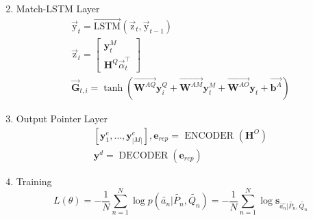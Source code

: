 \documentclass[a4paper,UTF8]{article}
\numberwithin{equation}{section}
\begin{document}
\begin{enumerate}
\begin{equation}
	\end{equation}
	\item Match-LSTM Layer
	\begin{equation}
	\begin{array}{c}{\overrightarrow{\mathrm{y}}_{t}=\overrightarrow{\mathrm{LSTM}}\left(\overrightarrow{\mathrm{z}}_{t}, \overrightarrow{\mathrm{y}}_{t-1}\right)} \\ {\overrightarrow{\mathrm{z}}_{t}=\left[\begin{array}{c}{\mathbf{y}_{t}^{M}} \\ {\mathbf{H}^{Q} \vec{\alpha}_{t}^{\top}}\end{array}\right]}\\\overrightarrow{\mathbf{G}}_{t, i}=\tanh \left(\overrightarrow{\mathbf{W}^{A Q}} \mathbf{y}_{i}^{Q}+\overrightarrow{\mathbf{W}^{A M}} \mathbf{y}_{t}^{M}+\overrightarrow{\mathbf{W}^{A O}} \mathbf{y}_{t}+\overrightarrow{\mathbf{b}^{A}}\right)\end{array}
	\end{equation}
	\item Output Pointer Layer
	\begin{equation}
	\begin{array}{c}{\left[\mathbf{y}_{1}^{e}, \ldots, \mathbf{y}_{|M|}^{e}\right], \mathbf{e}_{r e p}=\text { ENCODER }\left(\mathbf{H}^{O}\right)} \\ {\mathbf{y}^{d}=\operatorname{DECODER}\left(\mathbf{e}_{r e p}\right)}\end{array}
	\end{equation}
	\item Training
	\begin{equation}
		L(\theta)=-\frac{1}{N} \sum_{n=1}^{N} \log p\left(\widetilde{a_{n}} | \widetilde{P_{n}}, \widetilde{Q_{n}}\right)=-\frac{1}{N} \sum_{n=1}^{N} \log \mathbf{s}_{\widehat{a_{n}} | \widetilde{P_{n}}, \widetilde{Q_{n}}}
		\end{equation}
\end{enumerate}



\newpage
\end{document}
